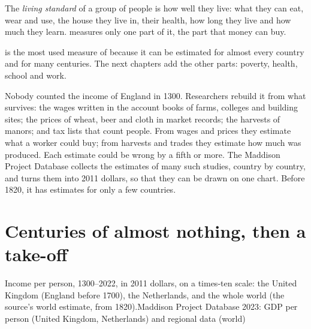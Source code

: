 \begin{definition}\label{def:g6:living-standards:living-standard}
The \emph{living standard} of a group of people is
how well they live: what they can eat, wear and use, the house they live in,
their health, how long they live and how much they learn. 
measures only one part of it, the part that money can buy.
\end{definition}

 is the most used measure of  because it can
be estimated for almost every country and for many centuries. The next
chapters add the other parts: poverty, health, school and work.

\begin{measure}
Nobody counted the income of England in 1300. Researchers rebuild it from
what survives: the wages written in the account books of farms, colleges and
building sites; the prices of wheat, beer and cloth in market records; the
harvests of manors; and tax lists that count people. From wages and prices
they estimate what a worker could buy; from harvests and trades they estimate
how much was produced. Each estimate could be wrong by a fifth or more. The
Maddison Project Database collects the estimates of many such studies, country
by country, and turns them into 2011 dollars, so that they can be drawn on one
chart. Before 1820, it has estimates for only a few countries.
\end{measure}

\section{Centuries of almost nothing, then a take-off}

\begin{omchart}{Income per person, 1300--2022, in 2011 dollars, on a times-ten
scale: the United Kingdom (England before 1700), the Netherlands, and the
whole world (the source's world estimate, from 1820).}{Maddison Project Database 2023: GDP per person (United Kingdom, Netherlands) and regional data (world)}
\end{omchart}

